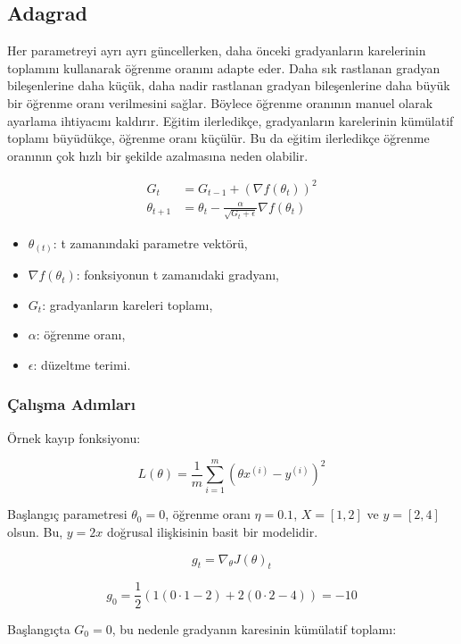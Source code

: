 \newpage

\subsection{Adagrad}
Her parametreyi ayrı ayrı güncellerken, daha önceki gradyanların karelerinin toplamını kullanarak öğrenme oranını adapte eder. Daha sık rastlanan gradyan bileşenlerine daha küçük, daha nadir rastlanan gradyan bileşenlerine daha büyük bir öğrenme oranı verilmesini sağlar. Böylece öğrenme oranının manuel olarak ayarlama ihtiyacını kaldırır. Eğitim ilerledikçe, gradyanların karelerinin kümülatif toplamı büyüdükçe, öğrenme oranı küçülür. Bu da eğitim ilerledikçe öğrenme oranının çok hızlı bir şekilde azalmasına neden olabilir.

\begin{align*}
G_{t} & = G_{t-1} + (\nabla f(\theta_t))^2 \\
\theta_{t+1} & = \theta_t - \frac{\alpha}{\sqrt{G_{t} + \epsilon}} \nabla f(\theta_t)
\end{align*}

\begin{itemize}
	\item $\theta_(t)$: t zamanındaki parametre vektörü,
	\item $\nabla f(\theta_{t})$: fonksiyonun t zamanıdaki gradyanı,
	\item $G_{t}$: gradyanların kareleri toplamı,
	\item $\alpha$: öğrenme oranı,
	\item $\epsilon$: düzeltme terimi.
\end{itemize}

\subsubsection{Çalışma Adımları}

Örnek kayıp fonksiyonu:

\[ L(\theta) = \frac{1}{m} \sum_{i=1}^{m} (\theta x^{(i)} - y^{(i)})^2 \]

Başlangıç parametresi $\theta_0 = 0$, öğrenme oranı $\eta = 0.1$, $X = [1, 2]$ ve $y = [2, 4]$ olsun. Bu, $y = 2x$ doğrusal ilişkisinin basit bir modelidir.

\[ g_t = \nabla_\theta J(\theta)_t \]

\[ g_0 = \frac{1}{2} (1(0 \cdot 1 - 2) + 2 (0 \cdot 2 - 4)) = -10 \]

Başlangıçta $G_0 = 0$, bu nedenle gradyanın karesinin kümülatif toplamı:

